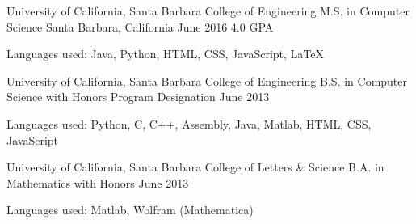 \begin{cventries}
  \cventry
    {University of California, Santa Barbara \newline College of Engineering}
    {M.S. in Computer Science%
}
    {Santa Barbara, California}
    {June 2016 \newline\vspace{-1mm} 4.0 GPA}
    {
    \begin{cvitems}
	\item {\scriptsize{Languages used: Java, Python, HTML, CSS, JavaScript,  \LaTeX}}
	\end{cvitems}
    }
\cventry
    {University of California, Santa Barbara \newline College of Engineering}
    {B.S. in Computer Science\newline\vspace{-1mm} {\scriptsize \textmd{with Honors Program Designation}}}
    {}
    {June 2013}{
    \begin{cvitems}
	\item {\scriptsize{Languages used: Python, C, C++, Assembly, Java, Matlab, HTML, CSS, JavaScript}}
	\end{cvitems}
}
\cventry
    {University of California, Santa Barbara \newline College of Letters \& Science}
    {B.A. in Mathematics \newline\vspace{-1mm} {\scriptsize \textmd{with Honors}}}
    {    }
    {June 2013}{\begin{cvitems}
	\item {\scriptsize{Languages used: Matlab, Wolfram (Mathematica)}}
	\end{cvitems}}
\end{cventries}